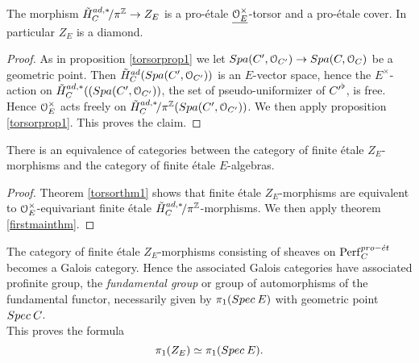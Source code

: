 \begin{prop}
The morphism
$\tilde{H}^{ad, *}_{C}\!/\pi^{\mathbb{Z}} \to Z_E$ is a  pro-\'{e}tale $\underline{\mathcal{O}_E^\times}$-torsor and a pro-\'{e}tale cover.
In particular $Z_E$ is a diamond.
\end{prop}
\begin{proof}
As in proposition \ref{torsorprop1} we let ${Spa({C'},{\mathcal{O}_{C'}})}\to{Spa({C},{\mathcal{O}_{C}})}$ be a geometric point. Then 
$\tilde{H}^{ad}_{C}({Spa({C'},{\mathcal{O}_{C'}})})$ is an $E$-vector space, hence the $E^\times$-action on 
$\tilde{H}^{ad, *}_{C}(({Spa({C'},{\mathcal{O}_{C'}})})$, the set of pseudo-uniformizer of ${C'}^{\flat}$, is free. Hence $\mathcal{O}_E^\times$ acts freely on $\tilde{H}^{ad, *}_{C}\!/\pi^{\mathbb{Z}}({Spa({C'},{\mathcal{O}_{C'}})})$. We then apply proposition \ref{torsorprop1}. This proves the claim.
\end{proof}


\begin{theorem}\label{secondmainthm}
There is an equivalence of categories between the category of finite \'{e}tale $Z_E$-morphisms
 and the
category of finite \'{e}tale $E$-algebras.
\end{theorem}
\begin{proof}
Theorem \ref{torsorthm1} shows that finite \'{e}tale $Z_E$-morphisms are equivalent to $\mathcal{O}_E^{\times}$-equivariant finite \'{e}tale $\tilde{H}^{ad, *}_{C}\!/\pi^{\mathbb{Z}}$-morphisms. We then apply theorem \ref{firstmainthm}.

\end{proof}
The category of finite \'{e}tale $Z_E$-morphisms consisting of sheaves on $\mathrm{Perf}_{C}^{pro-\acute{e}t}$ becomes a Galois category.
Hence the associated Galois categories have associated profinite group, the \emph{fundamental group} or group of automorphisms of the fundamental functor, necessarily given by $\pi_1({{Spec{\:E}}})$ with geometric point ${Spec{\:C}}$.\\

This proves the formula
\[\pi_1({Z_E})\simeq\pi_1({{Spec{\:E}}}).\]








\clearpage
\hfill
\clearpage















